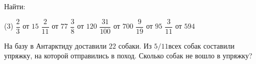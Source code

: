 \begin{homework}[number=3]
	\begin{listofex}
	\item Найти:
	\begin{tasks}(3)
		\task \( \dfrac{2}{3} \) от \( 15 \)
		\task \( \dfrac{2}{11} \) от \( 77 \)
		\task \( \dfrac{3}{8} \) от \( 120 \)
		\task \( \dfrac{31}{100} \) от \( 700 \)
		\task \( \dfrac{9}{19} \) от \( 95 \)
		\task \( \dfrac{3}{11} \) от \( 594 \)
	\end{tasks}
	\item На базу в Антарктиду доставили \( 22 \) собаки. Из \( 5/11 \)всех собак составили упряжку, на
	которой отправились в поход. Сколько собак не вошло в упряжку?
	\end{listofex}
\end{homework}

